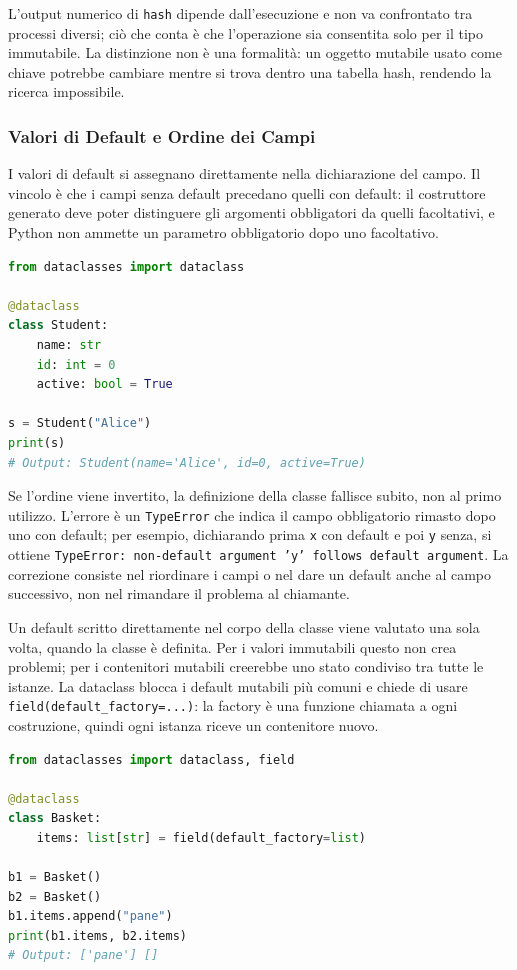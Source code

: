 \documentclass[12pt]{extarticle}
\begin{document}
\noindent L'output numerico di \texttt{hash} dipende dall'esecuzione e non va confrontato tra processi diversi; ciò che conta è che l'operazione sia consentita solo per il tipo immutabile. La distinzione non è una formalità: un oggetto mutabile usato come chiave potrebbe cambiare mentre si trova dentro una tabella hash, rendendo la ricerca impossibile.

\subsubsection{Valori di Default e Ordine dei Campi}

\noindent I valori di default si assegnano direttamente nella dichiarazione del campo. Il vincolo è che i campi senza default precedano quelli con default: il costruttore generato deve poter distinguere gli argomenti obbligatori da quelli facoltativi, e Python non ammette un parametro obbligatorio dopo uno facoltativo.

\begin{lstlisting}[language=Python]
from dataclasses import dataclass

@dataclass
class Student:
    name: str
    id: int = 0
    active: bool = True

s = Student("Alice")
print(s)
# Output: Student(name='Alice', id=0, active=True)
\end{lstlisting}

\noindent Se l'ordine viene invertito, la definizione della classe fallisce subito, non al primo utilizzo. L'errore è un \texttt{TypeError} che indica il campo obbligatorio rimasto dopo uno con default; per esempio, dichiarando prima \texttt{x} con default e poi \texttt{y} senza, si ottiene \texttt{TypeError: non-default argument 'y' follows default argument}. La correzione consiste nel riordinare i campi o nel dare un default anche al campo successivo, non nel rimandare il problema al chiamante.

\noindent Un default scritto direttamente nel corpo della classe viene valutato una sola volta, quando la classe è definita. Per i valori immutabili questo non crea problemi; per i contenitori mutabili creerebbe uno stato condiviso tra tutte le istanze. La dataclass blocca i default mutabili più comuni e chiede di usare \texttt{field(default\_factory=...)}: la factory è una funzione chiamata a ogni costruzione, quindi ogni istanza riceve un contenitore nuovo.

\begin{lstlisting}[language=Python]
from dataclasses import dataclass, field

@dataclass
class Basket:
    items: list[str] = field(default_factory=list)

b1 = Basket()
b2 = Basket()
b1.items.append("pane")
print(b1.items, b2.items)
# Output: ['pane'] []
\end{lstlisting}
\end{document}
